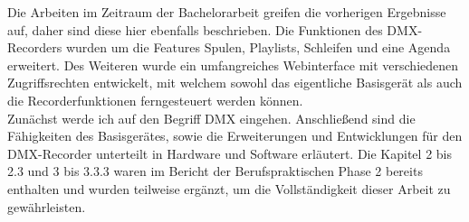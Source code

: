 \documentclass{scrartcl}
\begin{document}
Die Arbeiten im Zeitraum der Bachelorarbeit greifen die vorherigen Ergebnisse auf, daher sind diese
hier ebenfalls beschrieben. Die Funktionen des DMX-Recorders wurden um die Features Spulen,
Playlists, Schleifen und eine Agenda erweitert. Des Weiteren wurde ein umfangreiches Webinterface
mit verschiedenen Zugriffsrechten entwickelt, mit welchem sowohl das eigentliche Basisgerät als
auch die Recorderfunktionen ferngesteuert werden können.\\
Zunächst werde ich auf den Begriff DMX eingehen. Anschließend sind die Fähigkeiten des
Basisgerätes, sowie die Erweiterungen und Entwicklungen für den DMX-Recorder unterteilt in
Hardware und Software erläutert. Die Kapitel 2 bis 2.3 und 3 bis 3.3.3 waren im Bericht der
Berufspraktischen Phase 2 bereits enthalten und wurden teilweise ergänzt, um die Vollständigkeit
dieser Arbeit zu gewährleisten.\\
\end{document}
